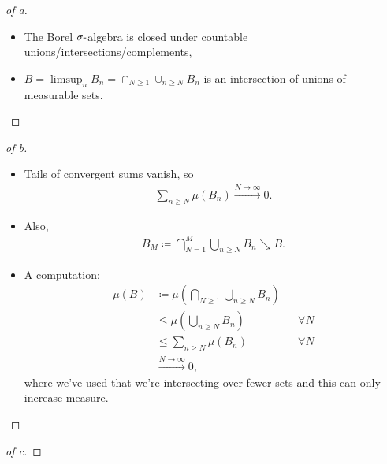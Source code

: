 \begin{solution}

\envlist

\begin{proof}[of a]

\envlist

\begin{itemize}
\tightlist
\item
  The Borel \(\sigma{\hbox{-}}\)algebra is closed under countable
  unions/intersections/complements,
\item
  \(B = \limsup_n B_n = \cap_{N\geq 1} \cup_{n\geq N} B_n\) is an
  intersection of unions of measurable sets.
\end{itemize}

\end{proof}

\begin{proof}[of b]

\envlist

\begin{itemize}
\tightlist
\item
  Tails of convergent sums vanish, so
  \begin{align*}
  \sum_{n\geq N} \mu(B_n) \xrightarrow{N\to\infty} 0
  .\end{align*}
\item
  Also,
  \begin{align*}
  B_M \coloneqq\displaystyle\bigcap_{N = 1}^M \displaystyle\bigcup_{n\geq N} B_n \searrow B 
  .\end{align*}
\item
  A computation:
  \begin{align*}
  \mu(B) 
  &\coloneqq\mu\left(\displaystyle\bigcap_{N\geq 1} \displaystyle\bigcup_{n\geq N} B_n\right) \\
  &\leq \mu\left( \displaystyle\bigcup_{n\geq N} B_n \right) && \forall N \\
  &\leq \sum_{n\geq N} \mu(B_n) && \forall N \\
  &\overset{N\to\infty}\longrightarrow 0
  ,\end{align*}
  where we've used that we're intersecting over fewer sets and this can
  only increase measure.
\end{itemize}

\end{proof}

\begin{proof}[of c]

\envlist


\end{proof}
\end{solution}
